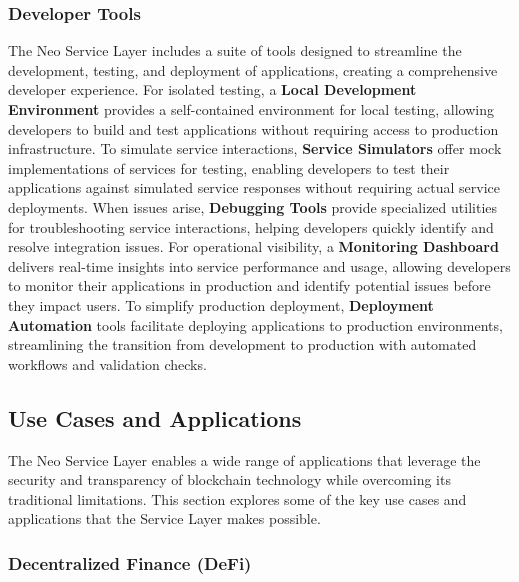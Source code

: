 \documentclass{article}
\begin{document}
\subsubsection{Developer Tools}
\label{subsubsec:developer-tools}

The Neo Service Layer includes a suite of tools designed to streamline the development, testing, and deployment of applications, creating a comprehensive developer experience. For isolated testing, a \textbf{Local Development Environment} provides a self-contained environment for local testing, allowing developers to build and test applications without requiring access to production infrastructure. To simulate service interactions, \textbf{Service Simulators} offer mock implementations of services for testing, enabling developers to test their applications against simulated service responses without requiring actual service deployments. When issues arise, \textbf{Debugging Tools} provide specialized utilities for troubleshooting service interactions, helping developers quickly identify and resolve integration issues. For operational visibility, a \textbf{Monitoring Dashboard} delivers real-time insights into service performance and usage, allowing developers to monitor their applications in production and identify potential issues before they impact users. To simplify production deployment, \textbf{Deployment Automation} tools facilitate deploying applications to production environments, streamlining the transition from development to production with automated workflows and validation checks.

\subsection{Use Cases and Applications}
\label{subsec:nsl-use-cases}

The Neo Service Layer enables a wide range of applications that leverage the security and transparency of blockchain technology while overcoming its traditional limitations. This section explores some of the key use cases and applications that the Service Layer makes possible.

\subsubsection{Decentralized Finance (DeFi)}
\label{subsubsec:defi}
\end{document}
